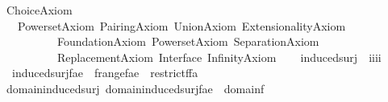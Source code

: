 %
\begin{isabellebody}%
%
%
\isadelimdocument
%
\endisadelimdocument
%
\isatagdocument
%
\isamarkuptrue%
%
\endisatagdocument
{\isafolddocument}%
%
\isadelimdocument
%
\endisadelimdocument
%
\isadelimtheory
%
\endisadelimtheory
%
\isatagtheory
{}\isamarkupfalse%
\ Choice{\isacharunderscore}{\kern0pt}Axiom\isanewline
\ \ \ Powerset{\isacharunderscore}{\kern0pt}Axiom\ Pairing{\isacharunderscore}{\kern0pt}Axiom\ Union{\isacharunderscore}{\kern0pt}Axiom\ Extensionality{\isacharunderscore}{\kern0pt}Axiom\ \isanewline
\ \ \ \ \ \ \ \ \ \ Foundation{\isacharunderscore}{\kern0pt}Axiom\ Powerset{\isacharunderscore}{\kern0pt}Axiom\ Separation{\isacharunderscore}{\kern0pt}Axiom\ \isanewline
\ \ \ \ \ \ \ \ \ \ Replacement{\isacharunderscore}{\kern0pt}Axiom\ Interface\ Infinity{\isacharunderscore}{\kern0pt}Axiom\isanewline
{}%
\endisatagtheory
{\isafoldtheory}%
%
\isadelimtheory
\isanewline
%
\endisadelimtheory
\isanewline
{}\isamarkupfalse%
\ \isanewline
\ \ induced{\isacharunderscore}{\kern0pt}surj\ {\isacharcolon}{\kern0pt}{\isacharcolon}{\kern0pt}\ {\isachardoublequoteopen}i{\isasymRightarrow}i{\isasymRightarrow}i{\isasymRightarrow}i{\isachardoublequoteclose}\ \isanewline
\ \ {\isachardoublequoteopen}induced{\isacharunderscore}{\kern0pt}surj{\isacharparenleft}{\kern0pt}f{\isacharcomma}{\kern0pt}a{\isacharcomma}{\kern0pt}e{\isacharparenright}{\kern0pt}\ {\isasymequiv}\ f{\isacharminus}{\kern0pt}{\isacharbackquote}{\kern0pt}{\isacharbackquote}{\kern0pt}{\isacharparenleft}{\kern0pt}range{\isacharparenleft}{\kern0pt}f{\isacharparenright}{\kern0pt}{\isacharminus}{\kern0pt}a{\isacharparenright}{\kern0pt}{\isasymtimes}{\isacharbraceleft}{\kern0pt}e{\isacharbraceright}{\kern0pt}\ {\isasymunion}\ restrict{\isacharparenleft}{\kern0pt}f{\isacharcomma}{\kern0pt}f{\isacharminus}{\kern0pt}{\isacharbackquote}{\kern0pt}{\isacharbackquote}{\kern0pt}a{\isacharparenright}{\kern0pt}{\isachardoublequoteclose}\isanewline
\ \ \isanewline
{}\isamarkupfalse%
\ domain{\isacharunderscore}{\kern0pt}induced{\isacharunderscore}{\kern0pt}surj{\isacharcolon}{\kern0pt}\ {\isachardoublequoteopen}domain{\isacharparenleft}{\kern0pt}induced{\isacharunderscore}{\kern0pt}surj{\isacharparenleft}{\kern0pt}f{\isacharcomma}{\kern0pt}a{\isacharcomma}{\kern0pt}e{\isacharparenright}{\kern0pt}{\isacharparenright}{\kern0pt}\ {\isacharequal}{\kern0pt}\ domain{\isacharparenleft}{\kern0pt}f{\isacharparenright}{\kern0pt}{\isachardoublequoteclose}\isanewline

\end{isabellebody}

